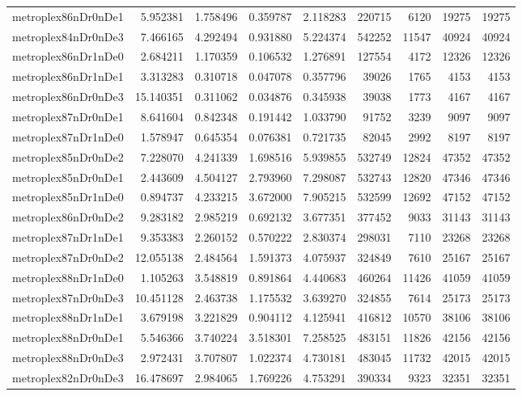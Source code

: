 \documentclass[../../../thesis.tex]{subfiles}
\begin{document}
\begin{longtable}{|l|r|r|r|r|r|r|r|r|}
metroplex86nDr0nDe1 & 5.952381 & 1.758496 & 0.359787 & 2.118283 & 220715 & 6120 & 19275 & 19275 \\
metroplex84nDr0nDe3 & 7.466165 & 4.292494 & 0.931880 & 5.224374 & 542252 & 11547 & 40924 & 40924 \\
metroplex86nDr1nDe0 & 2.684211 & 1.170359 & 0.106532 & 1.276891 & 127554 & 4172 & 12326 & 12326 \\
metroplex86nDr1nDe1 & 3.313283 & 0.310718 & 0.047078 & 0.357796 & 39026 & 1765 & 4153 & 4153 \\
metroplex86nDr0nDe3 & 15.140351 & 0.311062 & 0.034876 & 0.345938 & 39038 & 1773 & 4167 & 4167 \\
metroplex87nDr0nDe1 & 8.641604 & 0.842348 & 0.191442 & 1.033790 & 91752 & 3239 & 9097 & 9097 \\
metroplex87nDr1nDe0 & 1.578947 & 0.645354 & 0.076381 & 0.721735 & 82045 & 2992 & 8197 & 8197 \\
metroplex85nDr0nDe2 & 7.228070 & 4.241339 & 1.698516 & 5.939855 & 532749 & 12824 & 47352 & 47352 \\
metroplex85nDr0nDe1 & 2.443609 & 4.504127 & 2.793960 & 7.298087 & 532743 & 12820 & 47346 & 47346 \\
metroplex85nDr1nDe0 & 0.894737 & 4.233215 & 3.672000 & 7.905215 & 532599 & 12692 & 47152 & 47152 \\
metroplex86nDr0nDe2 & 9.283182 & 2.985219 & 0.692132 & 3.677351 & 377452 & 9033 & 31143 & 31143 \\
metroplex87nDr1nDe1 & 9.353383 & 2.260152 & 0.570222 & 2.830374 & 298031 & 7110 & 23268 & 23268 \\
metroplex87nDr0nDe2 & 12.055138 & 2.484564 & 1.591373 & 4.075937 & 324849 & 7610 & 25167 & 25167 \\
metroplex88nDr1nDe0 & 1.105263 & 3.548819 & 0.891864 & 4.440683 & 460264 & 11426 & 41059 & 41059 \\
metroplex87nDr0nDe3 & 10.451128 & 2.463738 & 1.175532 & 3.639270 & 324855 & 7614 & 25173 & 25173 \\
metroplex88nDr1nDe1 & 3.679198 & 3.221829 & 0.904112 & 4.125941 & 416812 & 10570 & 38106 & 38106 \\
metroplex88nDr0nDe1 & 5.546366 & 3.740224 & 3.518301 & 7.258525 & 483151 & 11826 & 42156 & 42156 \\
metroplex88nDr0nDe3 & 2.972431 & 3.707807 & 1.022374 & 4.730181 & 483045 & 11732 & 42015 & 42015 \\
metroplex82nDr0nDe3 & 16.478697 & 2.984065 & 1.769226 & 4.753291 & 390334 & 9323 & 32351 & 32351 \\

\end{longtable}
\end{document}

